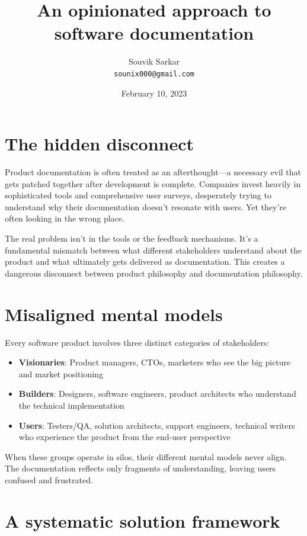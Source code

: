 \documentclass{article}
\title{\bfseries An opinionated approach to software documentation}
\author{Souvik Sarkar \\ \texttt{sounix000@gmail.com}} %
\date{February 10, 2023}
\begin{document}
\maketitle %

\section*{The hidden disconnect}

Product documentation is often treated as an afterthought---a necessary evil that gets patched together after development is complete. Companies invest heavily in sophisticated tools and comprehensive user surveys, desperately trying to understand why their documentation doesn't resonate with users. Yet they're often looking in the wrong place.

The real problem isn't in the tools or the feedback mechanisms. It's a fundamental mismatch between what different stakeholders understand about the product and what ultimately gets delivered as documentation. This creates a dangerous disconnect between product philosophy and documentation philosophy.

\section*{Misaligned mental models}

Every software product involves three distinct categories of stakeholders:

\begin{itemize}
    \item \textbf{Visionaries}: Product managers, CTOs, marketers who see the big picture and market positioning
    \item \textbf{Builders}: Designers, software engineers, product architects who understand the technical implementation
    \item \textbf{Users}: Testers/QA, solution architects, support engineers, technical writers who experience the product from the end-user perspective
\end{itemize}

When these groups operate in silos, their different mental models never align. The documentation reflects only fragments of understanding, leaving users confused and frustrated.

\section*{A systematic solution framework}
\end{document}

